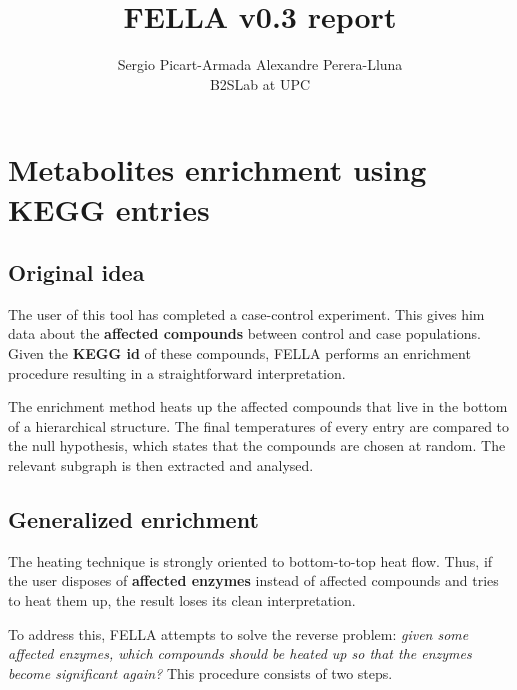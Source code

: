 \documentclass{article}\usepackage[]{graphicx}\usepackage[]{color}
\begin{document}



\title{FELLA v0.3 report}
\author{Sergio Picart-Armada \qquad Alexandre Perera-Lluna \\ B2SLab at UPC}
\maketitle
% 

\section{Metabolites enrichment using KEGG entries}

\subsection{Original idea}

The user of this tool has completed a case-control experiment. This gives him
data about the \textbf{affected compounds} between control and case populations.
Given the \textbf{KEGG id} of these compounds, FELLA performs an enrichment 
procedure resulting in a straightforward interpretation.

The enrichment method heats up the affected compounds that live in the bottom of
a hierarchical structure. The final temperatures of every entry are compared to the null 
hypothesis, which states that the compounds are chosen at random. The relevant 
subgraph is then extracted and analysed.

\subsection{Generalized enrichment}

The heating technique is strongly oriented to bottom-to-top heat flow. Thus, if 
the user disposes of \textbf{affected enzymes} instead of affected compounds and tries to heat them up, the result loses its clean interpretation. 

To address this, FELLA attempts to solve the reverse problem: \textit{given some affected enzymes, which compounds should be heated up so that the enzymes become 
significant again?} This procedure consists of two steps.
\end{document}
